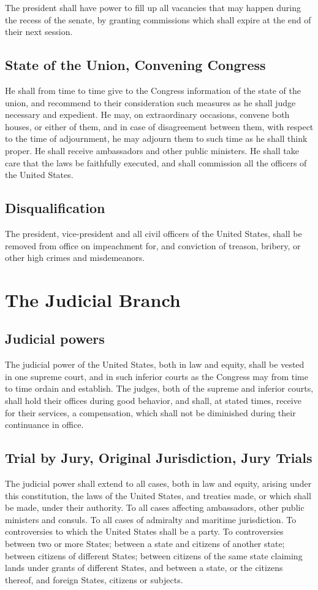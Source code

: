 \documentclass{constitution}
\begin{document}
The president shall have power to fill up all vacancies that may happen during the recess of the senate,
by granting commissions which shall expire at the end of their next session.

\section{State of the Union, Convening Congress}
He shall from time to time give to the Congress information of the state of the union,
and recommend to their consideration such measures as he shall judge necessary and expedient.
He may, on extraordinary occasions, convene both houses, or either of them,
and in case of disagreement between them, with respect to the time of adjournment, he may adjourn them to such time as he shall think proper.
He shall receive ambassadors and other public ministers.
He shall take care that the laws be faithfully executed,
and shall commission all the officers of the United States.

\section{Disqualification}
The president, vice-president and all civil officers of the United States, shall be removed from office on impeachment for, and conviction of treason, bribery, or other high crimes and misdemeanors.

\chapter{The Judicial Branch}
\section{Judicial powers}
The judicial power of the United States, both in law and equity,
shall be vested in one supreme court,
and in such inferior courts as the Congress may from time to time ordain and establish.
The judges, both of the supreme and inferior courts, shall hold their offices during good behavior,
and shall, at stated times, receive for their services, a compensation, which shall not be diminished during their continuance in office.

\section{Trial by Jury, Original Jurisdiction, Jury Trials}
The judicial power shall extend
to all cases, both in law and equity, arising under this constitution, the laws of the United States, and treaties made, or which shall be made, under their authority.
To all cases affecting ambassadors, other public ministers and consuls.
To all cases of admiralty and maritime jurisdiction.
To controversies to which the United States shall be a party.
To controversies between two or more States;
between a state and citizens of another state;
between citizens of different States;
between citizens of the same state claiming lands under grants of different States,
and between a state, or the citizens thereof, and foreign States, citizens or subjects.
\end{document}
